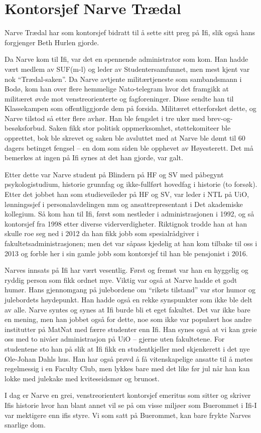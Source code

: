 \chapter{Kontorsjef Narve Trædal}

\author{Skrevet av Dag Langmyhr og Arne Maus}

Narve Trædal har som kontorsjef bidratt til å sette sitt preg på Ifi, slik også hans forgjenger Beth Hurlen gjorde.

Da Narve kom til Ifi, var det en spennende administrator som kom. Han hadde vært medlem av SUF(m-l) og leder av Studentersamfunnet, men mest kjent var nok ``Trædal-saken''. Da Narve avtjente militærtjeneste som sambandsmann i Bodø, kom han over flere hemmelige Nato-telegram hvor det framgikk at militæret øvde mot venstreorienterte og fagforeninger. Disse sendte han til Klassekampen som offentliggjorde dem på forsida. Militæret etterforsket dette, og Narve tilstod så etter flere avhør. Han ble fengslet i tre uker med brev-og-besøksforbud. Saken fikk stor politisk oppmerksomhet, støttekomiteer ble opprettet, bok ble skrevet og saken ble avsluttet med at Narve ble dømt til 60 dagers betinget fengsel – en dom som siden ble opphevet av Høyesterett. Det må bemerkes at ingen på Ifi synes at det han gjorde, var galt.

Etter dette var Narve student på Blindern på HF og SV med påbegynt psykologistudium, historie grunnfag og ikke-fullført hovedfag i historie (to forsøk). Etter det jobbet han som studieveileder på HF og SV, var leder i NTL på UiO, lønningssjef i personalavdelingen mm og ansattrepresentant i Det akademiske kollegium. Så kom han til Ifi, først som nestleder i administrasjonen i 1992, og så kontorsjef fra 1998 etter diverse viderverdigheter. Riktignok trodde han at han skulle roe seg ned i 2012 da han fikk jobb som spesialrådgiver i fakultetsadministrasjonen; men det var såpass kjedelig at han kom tilbake til oss i 2013 og forble her i sin gamle jobb som kontorsjef til han ble pensjonist i 2016.

Narves innsats på Ifi har vært vesentlig. Først og fremst var han en hyggelig og ryddig person som fikk ordnet mye. Viktig var også at Narve hadde et godt humør. Hans gjennomgang på julebordene om ``rikets tilstand'' var stor humor og julebordets høydepunkt. Han hadde også en rekke synspunkter som ikke ble delt av alle. Narve syntes og synes at Ifi burde bli et eget fakultet. Det var ikke bare en mening, men han jobbet også for dette, noe som ikke var populært hos andre institutter på MatNat med færre studenter enn Ifi. Han synes også at vi kan greie oss med to nivåer administrasjon på UiO – gjerne uten fakultetene. For studentene sto han på slik at Ifi fikk en studentkjeller med skjenkerett i det nye Ole-Johan Dahls hus. Han har også prøvd å få vitenskapelige ansatte til å møtes regelmessig i en Faculty Club, men lykkes bare med det like før jul når han kan lokke med julekake med kviteseidsmør og brunost.

I dag er Narve en grei, venstreorientert kontorsjef emeritus som sitter og skriver Ifis historie hvor han blant annet vil se på om visse miljøer som Buerommet i Ifi-I var mektigere enn ifis styre. Vi som satt på Buerommet, kan bare frykte Narves snarlige dom.
